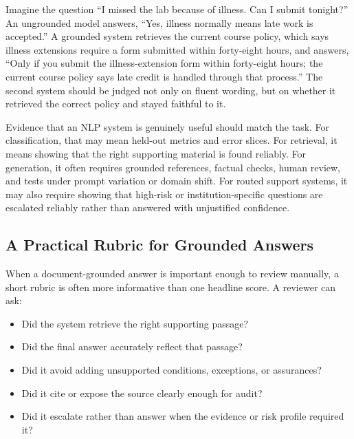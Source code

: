 \begin{example}
Imagine the question ``I missed the lab because of illness. Can I submit tonight?'' An ungrounded model answers, ``Yes, illness normally means late work is accepted.'' A grounded system retrieves the current course policy, which says illness extensions require a form submitted within forty-eight hours, and answers, ``Only if you submit the illness-extension form within forty-eight hours; the current course policy says late credit is handled through that process.'' The second system should be judged not only on fluent wording, but on whether it retrieved the correct policy and stayed faithful to it.
\end{example}

\begin{evidencebox}
Evidence that an NLP system is genuinely useful should match the task. For classification, that may mean held-out metrics and error slices. For retrieval, it means showing that the right supporting material is found reliably. For generation, it often requires grounded references, factual checks, human review, and tests under prompt variation or domain shift. For routed support systems, it may also require showing that high-risk or institution-specific questions are escalated reliably rather than answered with unjustified confidence.
\end{evidencebox}

\subsection{A Practical Rubric for Grounded Answers}

When a document-grounded answer is important enough to review manually, a short rubric is often more informative than one headline score. A reviewer can ask:
\begin{itemize}[leftmargin=*]
\item Did the system retrieve the right supporting passage?
\item Did the final answer accurately reflect that passage?
\item Did it avoid adding unsupported conditions, exceptions, or assurances?
\item Did it cite or expose the source clearly enough for audit?
\item Did it escalate rather than answer when the evidence or risk profile required it?
\end{itemize}

